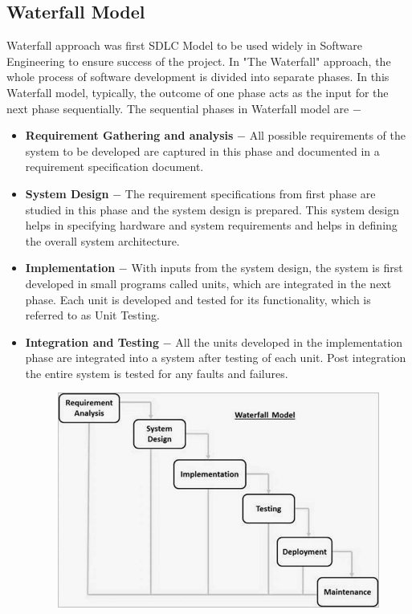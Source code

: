 \documentclass{article}
\begin{document}
\subsection{Waterfall Model} 
Waterfall approach was first SDLC Model to be used widely in Software Engineering to ensure success of the project. In "The Waterfall" approach, the whole process of software development is divided into separate phases. In this Waterfall model, typically, the outcome of one phase acts as the input for the next phase sequentially.
The sequential phases in Waterfall model are −
\begin{itemize}

\item    \textbf{Requirement Gathering and analysis} − All possible requirements of the system to be developed are captured in this phase and documented in a requirement specification document.

\item    \textbf{System Design} − The requirement specifications from first phase are studied in this phase and the system design is prepared. This system design helps in specifying hardware and system requirements and helps in defining the overall system architecture.

\item    \textbf{Implementation} − With inputs from the system design, the system is first developed in small programs called units, which are integrated in the next phase. Each unit is developed and tested for its functionality, which is referred to as Unit Testing.

\item    \textbf{Integration and Testing} − All the units developed in the implementation phase are integrated into a system after testing of each unit. Post integration the entire system is tested for any faults and failures.


\begin{figure}
  \includegraphics[width=\linewidth]{sdlc_waterfall_model}
\end{figure}

\end{itemize}
\end{document}
